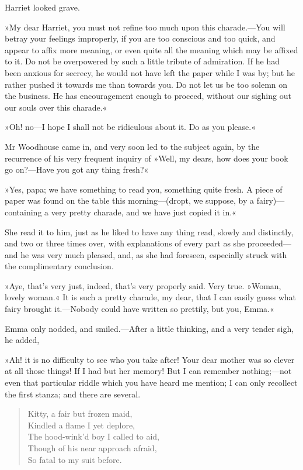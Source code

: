 Harriet looked grave.

»My dear Harriet, you must not refine too much upon this charade.—You will betray your feelings improperly, if you are too conscious and too quick, and appear to affix more meaning, or even quite all the meaning which may be affixed to it. Do not be overpowered by such a little tribute of admiration. If he had been anxious for secrecy, he would not have left the paper while I was by; but he rather pushed it towards me than towards you. Do not let us be too solemn on the business. He has encouragement enough to proceed, without our sighing out our souls over this charade.«

»Oh! no—I hope I shall not be ridiculous about it. Do as you please.«

Mr Woodhouse came in, and very soon led to the subject again, by the recurrence of his very frequent inquiry of »Well, my dears, how does your book go on?—Have you got any thing fresh?«

»Yes, papa; we have something to read you, something quite fresh. A piece of paper was found on the table this morning—(dropt, we suppose, by a fairy)—containing a very pretty charade, and we have just copied it in.«

She read it to him, just as he liked to have any thing read, slowly and distinctly, and two or three times over, with explanations of every part as she proceeded—and he was very much pleased, and, as she had foreseen, especially struck with the complimentary conclusion.

»Aye, that's very just, indeed, that's very properly said. Very true. »Woman, lovely woman.« It is such a pretty charade, my dear, that I can easily guess what fairy brought it.—Nobody could have written so prettily, but you, Emma.«

Emma only nodded, and smiled.—After a little thinking, and a very tender sigh, he added,

»Ah! it is no difficulty to see who you take after! Your dear mother was so clever at all those things! If I had but her memory! But I can remember nothing;—not even that particular riddle which you have heard me mention; I can only recollect the first stanza; and there are several.

\begin{letter}
	\clearpage 
\end{letter}

\begin{samepage}
\begin{verse}
Kitty, a fair but frozen maid,\\
    Kindled a flame I yet deplore,\\
The hood-wink'd boy I called to aid,\\
Though of his near approach afraid,\\
    So fatal to my suit before.\\
	\end{verse}
\end{samepage}

